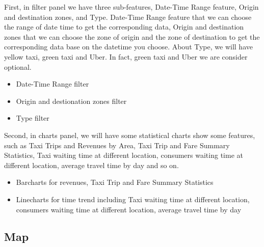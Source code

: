 \documentclass{article}
\begin{document}
            First, in filter panel we have three sub-features, Date-Time Range feature, Origin and destination zones, and Type.  
            Date-Time Range feature that we can choose the range of date time to get the corresponding data, Origin and destination zones 
            that we can choose the zone of origin and the zone of destination to get the corresponding data base on the datetime you choose. 
            About Type, we will have yellow taxi, green taxi and Uber. In fact,  green taxi and Uber we are consider optional.
            \begin{itemize}
                \item Date-Time Range filter
                \item Origin and destionation zones filter
                \item Type filter
            \end{itemize}

            Second, in charts panel, we will have some statistical charts show some features, such as Taxi Trips and Revenues by Area, 
            Taxi Trip and Fare Summary Statistics, Taxi waiting time at different location, consumers waiting time at different location, average travel time by day and so on.
            \begin{itemize}
                \item Barcharts for revenues, Taxi Trip and Fare Summary Statistics
                \item Linecharts for time trend including Taxi waiting time at different location, consumers waiting time at different location, average travel time by day
            \end{itemize}
        \subsection{Map}
\end{document}
